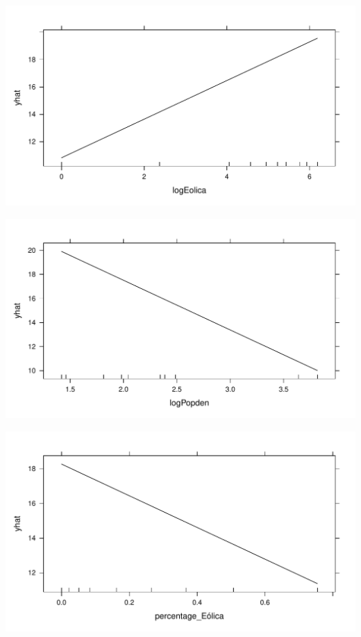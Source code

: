 \documentclass[
]{report}
\begin{document}
\includegraphics{Modelling_Energy_Intensity-V3_files/figure-pdf/unnamed-chunk-13-2.pdf}

\includegraphics{Modelling_Energy_Intensity-V3_files/figure-pdf/unnamed-chunk-13-3.pdf}

\includegraphics{Modelling_Energy_Intensity-V3_files/figure-pdf/unnamed-chunk-13-4.pdf}
\end{document}
